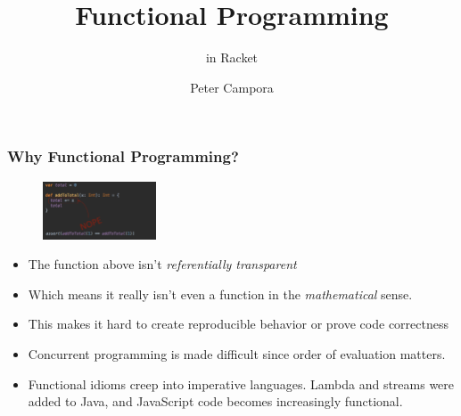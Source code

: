 \documentclass{beamer}
\title{Functional Programming}
\subtitle{in Racket}
\author{Peter Campora}
\institute{ULL}
\begin{document}
\begin{frame}
\titlepage
\end{frame}

\begin{frame}
  \frametitle{Why Functional Programming?}
  \begin{figure}[t]
    \centering \includegraphics[width=0.3\textwidth]{images/referential-transparency.png}
  \end{figure}
  \begin{itemize}
  \item<2-> The function above isn't \emph{referentially transparent}
  \item<3-> Which means it really isn't even a function in the \emph{mathematical} sense.
  \item<4-> This makes it hard to create reproducible behavior or prove code correctness
  \item<5-> Concurrent programming is made difficult since order of evaluation matters.
  \item<6-> Functional idioms creep into imperative languages. Lambda and streams
    were added to Java, and JavaScript code becomes increasingly functional.
  \end{itemize}
\end{frame}
 
\end{document}
